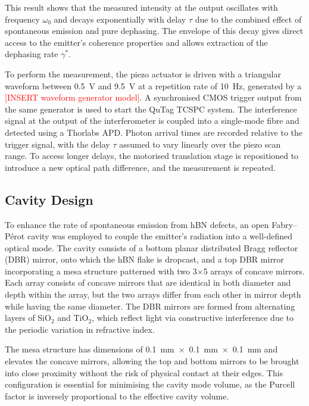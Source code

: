 This result shows that the measured intensity at the output oscillates with frequency $\omega_0$ and decays exponentially with delay $\tau$ due to the combined effect of spontaneous emission and pure dephasing. The envelope of this decay gives direct access to the emitter’s coherence properties and allows extraction of the dephasing rate $\gamma^*$.

To perform the measurement, the piezo actuator is driven with a triangular waveform between 0.5~V and 9.5~V at a repetition rate of 10~Hz, generated by a \textcolor{red}{[INSERT waveform generator model]}. A synchronised CMOS trigger output from the same generator is used to start the QuTag TCSPC system. The interference signal at the output of the interferometer is coupled into a single-mode fibre and detected using a Thorlabs APD. Photon arrival times are recorded relative to the trigger signal, with the delay $\tau$ assumed to vary linearly over the piezo scan range. To access longer delays, the motorised translation stage is repositioned to introduce a new optical path difference, and the measurement is repeated.


\subsection{Cavity Design}

To enhance the rate of spontaneous emission from hBN defects, an open Fabry–Pérot cavity was employed to couple the emitter’s radiation into a well-defined optical mode. The cavity consists of a bottom planar distributed Bragg reflector (DBR) mirror, onto which the hBN flake is dropcast, and a top DBR mirror incorporating a mesa structure patterned with two 3$\times$5 arrays of concave mirrors. Each array consists of concave mirrors that are identical in both diameter and depth within the array, but the two arrays differ from each other in mirror depth while having the same diameter. The DBR mirrors are formed from alternating layers of SiO$_2$ and TiO$_2$, which reflect light via constructive interference due to the periodic variation in refractive index.

The mesa structure has dimensions of 0.1~mm~$\times$~0.1~mm~$\times$~0.1~mm and elevates the concave mirrors, allowing the top and bottom mirrors to be brought into close proximity without the risk of physical contact at their edges. This configuration is essential for minimising the cavity mode volume, as the Purcell factor is inversely proportional to the effective cavity volume.

